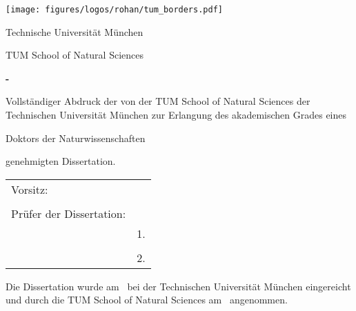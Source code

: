 \thispagestyle{empty}
\hfill
\texttt{[image: figures/logos/rohan/tum\_borders.pdf]}
\vspace*{0.5cm}

\begin{center}
	{\Large Technische Universit\"at M\"unchen}
\end{center}
\vspace*{0.5cm}

\begin{center}
	{\Large TUM School of Natural Sciences}
\end{center}
\vspace*{0.5cm}


\begin{center}
	{
		\LARGE\textbf{\getTitle - }\par
		\vspace{0.3cm}
		\large \textbf{\getSubTitle}\par
	}
\end{center}
\vspace*{0.5cm}

\begin{center}
	{\Large \textbf{\getAuthor}}
\end{center}
\vspace*{1.0cm}

\vfill
{\setlength{\parindent}{0cm} Vollst\"andiger Abdruck der von der TUM School of Natural Sciences der Technischen Universit\"at M\"unchen zur Erlangung des akademischen Grades eines}
\begin{center}
	{Doktors der Naturwissenschaften}
\end{center}
{genehmigten Dissertation.}
\vspace*{1cm}
\begin{table}[h]
	\centering
	\begin{tabular}{ll}
		{Vorsitz:}  & {\;\;\; \getChairman} \\
		& \\
		{Pr\"ufer der Dissertation:} & \\
		& {1. \getSupervisor} \\
		& \\	
		& {2. \getExaminer} \\
	\end{tabular}
\end{table}
\vspace*{1cm}

{\setlength{\parindent}{0cm} Die Dissertation wurde am \getSubmissionDate\ bei
	der Technischen Universit\"at M\"unchen eingereicht und durch die
	TUM School of Natural Sciences
	am \getAcceptanceDate\ angenommen.}

\pagestyle{empty}